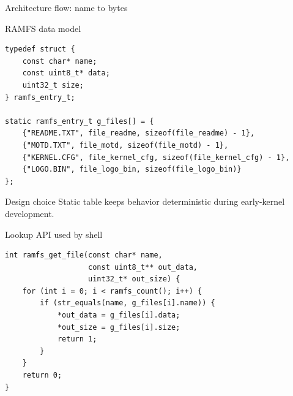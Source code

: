\documentclass[aspectratio=169]{beamer}
\newcommand{\concept}[2]{%
  \begin{block}{#1}\smallskip #2\smallskip\end{block}\vspace{5pt}}
\begin{document}
\begin{frame}{Architecture flow: name to bytes}
\begin{center}
\end{center}
\end{frame}

\begin{frame}[fragile]{RAMFS data model}
\begin{lstlisting}[style=clang]
typedef struct {
    const char* name;
    const uint8_t* data;
    uint32_t size;
} ramfs_entry_t;

static ramfs_entry_t g_files[] = {
    {"README.TXT", file_readme, sizeof(file_readme) - 1},
    {"MOTD.TXT", file_motd, sizeof(file_motd) - 1},
    {"KERNEL.CFG", file_kernel_cfg, sizeof(file_kernel_cfg) - 1},
    {"LOGO.BIN", file_logo_bin, sizeof(file_logo_bin)}
};
\end{lstlisting}
\concept{Design choice}{
  Static table keeps behavior deterministic during early-kernel development.
}
\end{frame}

\begin{frame}[fragile]{Lookup API used by shell}
\begin{lstlisting}[style=clang]
int ramfs_get_file(const char* name,
                   const uint8_t** out_data,
                   uint32_t* out_size) {
    for (int i = 0; i < ramfs_count(); i++) {
        if (str_equals(name, g_files[i].name)) {
            *out_data = g_files[i].data;
            *out_size = g_files[i].size;
            return 1;
        }
    }
    return 0;
}
\end{lstlisting}
\end{frame}
\end{document}
